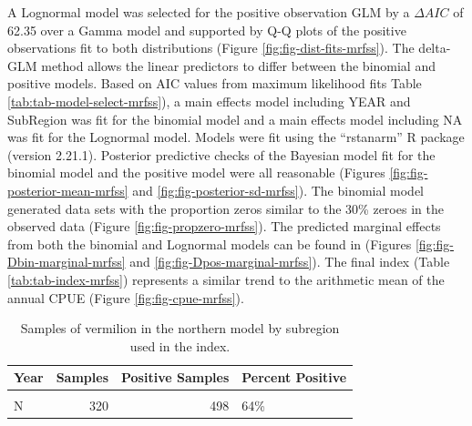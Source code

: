 \documentclass[
  english,
  a4paper,
]{article}
\begin{document}
A Lognormal model was
selected for the positive observation GLM by
a \(\Delta AIC\) of 62.35 over a Gamma model and supported by Q-Q plots of the positive observations fit to both distributions (Figure \ref{fig:fig-dist-fits-mrfss}). The delta-GLM
method allows the linear predictors to differ between the binomial and positive models.
Based on AIC values from maximum likelihood fits Table \ref{tab:tab-model-select-mrfss}),
a main effects model including
YEAR and SubRegion
was fit for the binomial model and a main
effects model including
NA
was fit for the Lognormal model.
Models were fit using the ``rstanarm'' R package (version 2.21.1). Posterior predictive
checks of the Bayesian model fit for the binomial model and the positive model
were all reasonable (Figures \ref{fig:fig-posterior-mean-mrfss} and
\ref{fig:fig-posterior-sd-mrfss}). The binomial model generated data sets with the
proportion zeros similar to the
30\%
zeroes in the observed data (Figure \ref{fig:fig-propzero-mrfss}).
The predicted marginal effects from both the binomial and Lognormal models
can be found in (Figures \ref{fig:fig-Dbin-marginal-mrfss} and
\ref{fig:fig-Dpos-marginal-mrfss}). The final index (Table \ref{tab:tab-index-mrfss})
represents a similar trend to the arithmetic mean of the annual CPUE (Figure \ref{fig:fig-cpue-mrfss}).

\newpage

\begin{table}

\caption{\label{tab:tab-region-mrfss}Samples of vermilion in the northern model by subregion used in the index.}
\centering
\begin{tabular}[t]{lrrl}
\toprule
Year & Samples & Positive Samples & Percent Positive\\
\midrule
\cellcolor{gray!6}{C} & \cellcolor{gray!6}{442} & \cellcolor{gray!6}{585} & \cellcolor{gray!6}{76\%}\\
N & 320 & 498 & 64\%\\
\bottomrule
\end{tabular}
\end{table}
\end{document}
